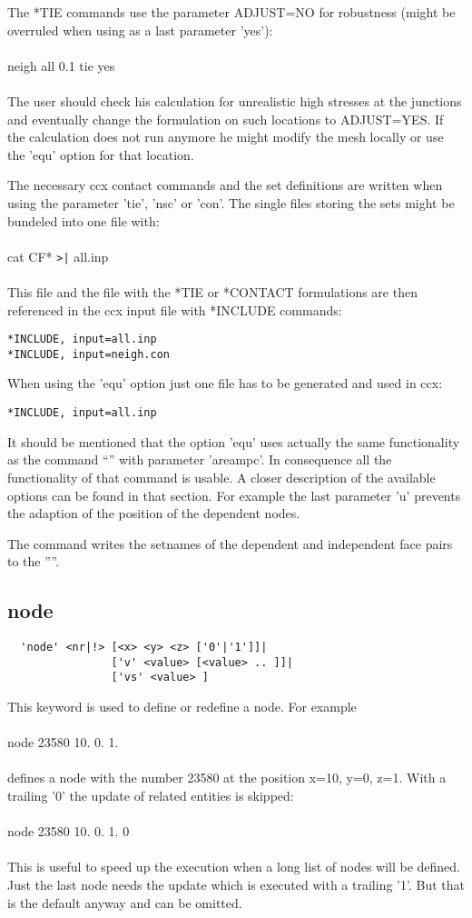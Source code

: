 \documentclass{article}
\begin{document}
The *TIE commands use the parameter ADJUST=NO for robustness (might be overruled when using as a last parameter 'yes'):\\\\ neigh all 0.1 tie yes\\\\The user should check his calculation for unrealistic high stresses at the junctions and eventually change the formulation on such locations to ADJUST=YES. If the calculation does not run anymore he might modify the mesh locally or use the 'equ' option for that location.

The necessary ccx contact commands and the set definitions are written when using the parameter 'tie', 'nsc' or 'con'. The single files storing the sets might be bundeled into one file with:\\\\cat CF* \verb_>|_ all.inp\\\\This file and the file with the *TIE or *CONTACT formulations are then referenced in the ccx input file with *INCLUDE commands:
\begin{verbatim}
*INCLUDE, input=all.inp
*INCLUDE, input=neigh.con
\end{verbatim}
When using the 'equ' option just one file has to be generated and used in ccx:
\begin{verbatim}
*INCLUDE, input=all.inp
\end{verbatim}

It should be mentioned that the option 'equ' uses actually the same functionality as the command ``'' with parameter 'areampc'. In consequence all the functionality of that command is usable. A closer description of the available options can be found in that section. For example the last parameter 'u' prevents the adaption of the position of the dependent nodes.

The command writes the setnames of the dependent and independent face pairs to the ''''.

\subsection{\label{node}node}
\begin{verbatim}
  'node' <nr|!> [<x> <y> <z> ['0'|'1']]|
                ['v' <value> [<value> .. ]]|
                ['vs' <value> ]
\end{verbatim}
This keyword is used to define or redefine a node. For example\\\\node 23580 10. 0. 1.\\\\defines a node with the number 23580 at the position x=10, y=0, z=1. With a trailing '0' the update of related entities is skipped:\\\\node 23580 10. 0. 1. 0\\\\This is useful to speed up the execution when a long list of nodes will be defined. Just the last node needs the update which is executed with a trailing '1'. But that is the default anyway and can be omitted.
\end{document}
